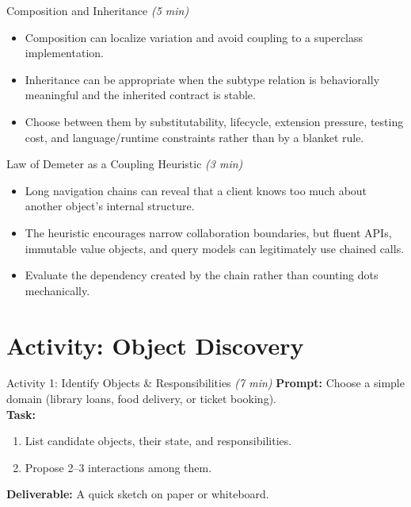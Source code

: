 \documentclass[aspectratio=169,11pt]{beamer}
\newcommand{\mins}[1]{\textit{(#1 min)}}
\begin{document}
\begin{frame}{Composition and Inheritance \mins{5}}
  \begin{itemize}
    \item Composition can localize variation and avoid coupling to a superclass implementation.
    \item Inheritance can be appropriate when the subtype relation is behaviorally meaningful and the inherited contract is stable.
    \item Choose between them by substitutability, lifecycle, extension pressure, testing cost, and language/runtime constraints rather than by a blanket rule.
  \end{itemize}
\end{frame}

\begin{frame}{Law of Demeter as a Coupling Heuristic \mins{3}}
  \begin{itemize}
    \item Long navigation chains can reveal that a client knows too much about another object's internal structure.
    \item The heuristic encourages narrow collaboration boundaries, but fluent APIs, immutable value objects, and query models can legitimately use chained calls.
    \item Evaluate the dependency created by the chain rather than counting dots mechanically.
  \end{itemize}
\end{frame}

\section{Activity: Object Discovery}

\begin{frame}{Activity 1: Identify Objects \& Responsibilities \mins{7}}
  \textbf{Prompt:} Choose a simple domain (library loans, food delivery, or ticket booking).\\[0.6em]
  \textbf{Task:}
  \begin{enumerate}
    \item List candidate objects, their state, and responsibilities.
    \item Propose 2–3 interactions among them.
  \end{enumerate}
  \textbf{Deliverable:} A quick sketch on paper or whiteboard.
\end{frame}
\end{document}
